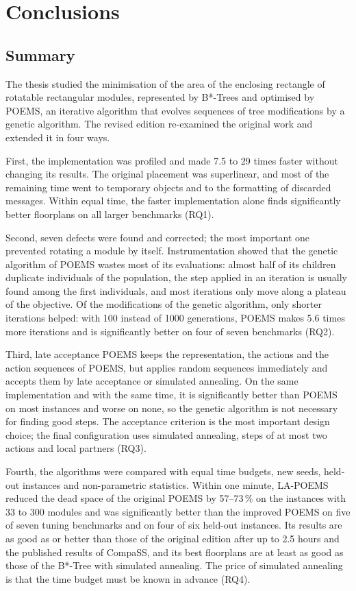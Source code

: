\chapter{Conclusions}
\label{sec:conclusions}

\section{Summary}

The thesis studied the minimisation of the area of the enclosing rectangle of rotatable rectangular modules, represented by B*-Trees and optimised by POEMS, an iterative algorithm that evolves sequences of tree modifications by a genetic algorithm. The revised edition re-examined the original work and extended it in four ways.

First, the implementation was profiled and made 7.5 to 29 times faster without changing its results. The original placement was superlinear, and most of the remaining time went to temporary objects and to the formatting of discarded messages. Within equal time, the faster implementation alone finds significantly better floorplans on all larger benchmarks (RQ1).

Second, seven defects were found and corrected; the most important one prevented rotating a module by itself. Instrumentation showed that the genetic algorithm of POEMS wastes most of its evaluations: almost half of its children duplicate individuals of the population, the step applied in an iteration is usually found among the first individuals, and most iterations only move along a plateau of the objective. Of the modifications of the genetic algorithm, only shorter iterations helped: with 100 instead of 1000 generations, POEMS makes 5.6 times more iterations and is significantly better on four of seven benchmarks (RQ2).

Third, late acceptance POEMS keeps the representation, the actions and the action sequences of POEMS, but applies random sequences immediately and accepts them by late acceptance or simulated annealing. On the same implementation and with the same time, it is significantly better than POEMS on most instances and worse on none, so the genetic algorithm is not necessary for finding good steps. The acceptance criterion is the most important design choice; the final configuration uses simulated annealing, steps of at most two actions and local partners (RQ3).

Fourth, the algorithms were compared with equal time budgets, new seeds, held-out instances and non-parametric statistics. Within one minute, LA-POEMS reduced the dead space of the original POEMS by 57--73\,\% on the instances with 33 to 300 modules and was significantly better than the improved POEMS on five of seven tuning benchmarks and on four of six held-out instances. Its results are as good as or better than those of the original edition after up to 2.5 hours and the published results of CompaSS, and its best floorplans are at least as good as those of the B*-Tree with simulated annealing. The price of simulated annealing is that the time budget must be known in advance (RQ4).

